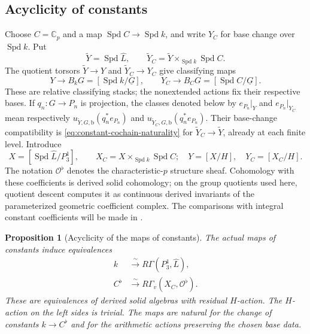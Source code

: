 \documentclass[11pt]{article}
\numberwithin{equation}{section}
\newtheorem{proposition}[theorem]{Proposition}
\theoremstyle{definition}
\theoremstyle{remark}
\begin{document}
\subsection{Acyclicity of constants}

Choose $C=\mathbb C_p$ and a map $\operatorname{Spd} C\to\operatorname{Spd} k$, and write $Y_C$ for
base change over $\operatorname{Spd} k$.  Put
\[
 \widetilde Y=\operatorname{Spd}\widehat L,\qquad
 \widetilde Y_C=\widetilde Y\times_{\operatorname{Spd} k}\operatorname{Spd} C.
\]
The quotient torsors $\widetilde Y\to Y$ and $\widetilde Y_C\to Y_C$
give classifying maps
\[
 Y\longrightarrow B_kG=[\operatorname{Spd} k/\underline G],\qquad
 Y_C\longrightarrow B_CG=[\operatorname{Spd} C/\underline G].
\]
These are relative classifying stacks; the nonextended actions fix
their respective bases.  If $q_n:G\to P_n$ is projection, the classes
denoted below by $e_{P_n}|_Y$ and $e_{P_n}|_{Y_C}$ mean respectively
$u_{\widetilde Y,G,\mathrm b}(q_n^*e_{P_n})$ and
$u_{\widetilde Y_C,G,\mathrm b}(q_n^*e_{P_n})$.
Their base-change compatibility is
\eqref{eq:constant-cochain-naturality} for
$\widetilde Y_C\to\widetilde Y$, already at each finite level.  Introduce
\[
 X=[\operatorname{Spd}\widehat L/P_3^1],\qquad
 X_C=X\times_{\operatorname{Spd} k}\operatorname{Spd} C;
 \quad Y=[X/H],\quad Y_C=[X_C/H].
\]
The notation $\mathcal O^{\flat}$ denotes the characteristic-$p$ structure
sheaf.  Cohomology with these coefficients is derived solid cohomology;
on the group quotients used here, quotient descent computes it as
continuous derived invariants of the parameterized geometric coefficient
complex.  The comparisons
with integral constant coefficients will be made in
.

\begin{proposition}[Acyclicity of the maps of constants]
\label{prop:constant-acyclicity}
The actual maps of constants induce equivalences
\begin{align}
 k&\xrightarrow{\ \sim\ }R\Gamma(P_3^1,\widehat L),
       \label{eq:finite-constant-map}\\
 C^{\flat}&\xrightarrow{\ \sim\ }
       R\Gamma_v(X_C,\mathcal O^{\flat}).
       \label{eq:geometric-constant-map}
\end{align}
These are equivalences of derived solid algebras with residual $H$-action.
The $H$-action on the left sides is trivial.  The maps are natural for
the change of constants $k\to C^{\flat}$ and for the arithmetic actions
preserving the chosen base data.
\end{proposition}
\end{document}
